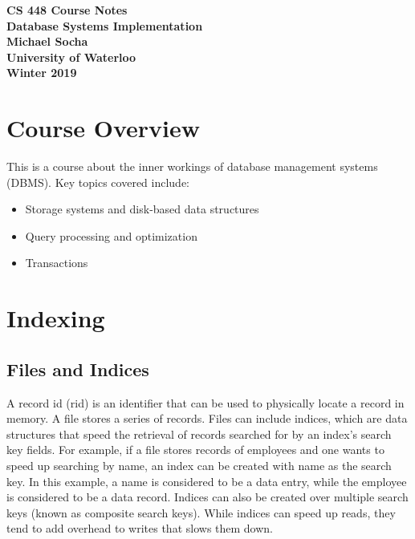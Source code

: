 \documentclass[12pt,titlepage]{article}
\let\stdsection\section
\renewcommand\section{\clearpage\stdsection}
\begin{document}
  \begin{titlepage}
    \vspace*{\fill}
    \centering

    \textbf{\Huge CS 448 Course Notes} \\ [0.4em]
    \textbf{\Large Database Systems Implementation} \\ [1em]
    \textbf{\Large Michael Socha} \\ [1em]
    \textbf{\large University of Waterloo} \\
    \textbf{\large Winter 2019} \\
    \vspace*{\fill}
  \end{titlepage}

  \newpage 


  \tableofcontents

  \newpage


  \section{Course Overview}
    This is a course about the inner workings of database management systems (DBMS). Key topics covered include:
    \begin{itemize}
      \item Storage systems and disk-based data structures
      \item Query processing and optimization
      \item Transactions
    \end{itemize}

  \section{Indexing}

    \subsection{Files and Indices}
      A record id (rid) is an identifier that can be used to physically locate a record in memory. A file stores
      a series of records. Files can include indices, which are data structures that speed the retrieval of records
      searched for by an index's search key fields. For example, if a file stores records of employees and one wants
      to speed up searching by name, an index can be created with name as the search key. In this example, a name is
      considered to be a data entry, while the employee is considered to be a data record. Indices can also be created
      over multiple search keys (known as composite search keys). While indices can speed up reads, they tend to add
      overhead to writes that slows them down.
\end{document}

